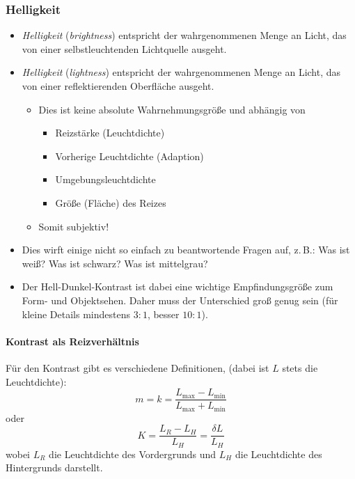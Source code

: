 			\subsubsection{Helligkeit}
				\begin{itemize}
					\item \emph{Helligkeit} (\emph{brightness}) entspricht der wahrgenommenen Menge an Licht, das von einer selbstleuchtenden Lichtquelle ausgeht.
					\item \emph{Helligkeit} (\emph{lightness}) entspricht der wahrgenommenen Menge an Licht, das von einer reflektierenden Oberfläche ausgeht.
						\begin{itemize}
							\item Dies ist keine absolute Wahrnehmungsgröße und abhängig von
								\begin{itemize}
									\item Reizstärke (Leuchtdichte)
									\item Vorherige Leuchtdichte (Adaption)
									\item Umgebungsleuchtdichte
									\item Größe (Fläche) des Reizes
								\end{itemize}
							\item Somit subjektiv!
						\end{itemize}
					\item Dies wirft einige nicht so einfach zu beantwortende Fragen auf, z.\,B.: Was ist weiß? Was ist schwarz? Was ist mittelgrau?
					\item Der Hell-Dunkel-Kontrast ist dabei eine wichtige Empfindungsgröße zum Form- und Objektsehen. Daher muss der Unterschied groß genug sein (für kleine Details mindestens \(3:1\), besser \(10:1\)).
				\end{itemize}

				\paragraph{Kontrast als Reizverhältnis}
					Für den Kontrast gibt es verschiedene Definitionen, \zB (dabei ist \(L\) stets die Leuchtdichte):
					\begin{equation*}
						m = k = \frac{L_\text{max} - L_\text{min}}{L_\text{max} + L_\text{min}}
					\end{equation*}
					oder
					\begin{equation*}
						K = \frac{L_R - L_H}{L_H} = \frac{\delta L}{L_H}
					\end{equation*}
					wobei \( L_R \) die Leuchtdichte des Vordergrunds und \(L_H\) die Leuchtdichte des Hintergrunds darstellt.
					
